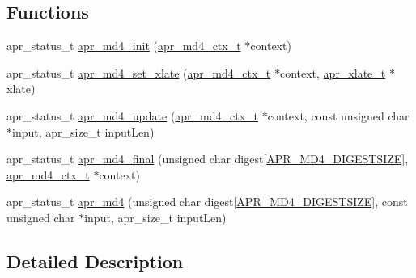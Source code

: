 \subsection*{Functions}
\begin{DoxyCompactItemize}
\item 
apr\-\_\-status\-\_\-t \hyperlink{group___a_p_r___util___m_d4_ga3f2ae0d6d93b1dd7a5efe11c241aee4b}{apr\-\_\-md4\-\_\-init} (\hyperlink{structapr__md4__ctx__t}{apr\-\_\-md4\-\_\-ctx\-\_\-t} $\ast$context)
\item 
apr\-\_\-status\-\_\-t \hyperlink{group___a_p_r___util___m_d4_ga86138845d199bf164093670fb2a803c3}{apr\-\_\-md4\-\_\-set\-\_\-xlate} (\hyperlink{structapr__md4__ctx__t}{apr\-\_\-md4\-\_\-ctx\-\_\-t} $\ast$context, \hyperlink{group___a_p_r___x_l_a_t_e_ga069dabbadc30e3a4157c38104a250e77}{apr\-\_\-xlate\-\_\-t} $\ast$xlate)
\item 
apr\-\_\-status\-\_\-t \hyperlink{group___a_p_r___util___m_d4_gacbdaec9b84aa725c29fcaac196065556}{apr\-\_\-md4\-\_\-update} (\hyperlink{structapr__md4__ctx__t}{apr\-\_\-md4\-\_\-ctx\-\_\-t} $\ast$context, const unsigned char $\ast$input, apr\-\_\-size\-\_\-t input\-Len)
\item 
apr\-\_\-status\-\_\-t \hyperlink{group___a_p_r___util___m_d4_ga292ac23cbfedc3ff227ced262ec09b30}{apr\-\_\-md4\-\_\-final} (unsigned char digest\mbox{[}\hyperlink{group___a_p_r___util___m_d4_ga84489272090a11902d831c288c81c20f}{A\-P\-R\-\_\-\-M\-D4\-\_\-\-D\-I\-G\-E\-S\-T\-S\-I\-Z\-E}\mbox{]}, \hyperlink{structapr__md4__ctx__t}{apr\-\_\-md4\-\_\-ctx\-\_\-t} $\ast$context)
\item 
apr\-\_\-status\-\_\-t \hyperlink{group___a_p_r___util___m_d4_ga8f11756aee7a293e2b05f9b1ed112431}{apr\-\_\-md4} (unsigned char digest\mbox{[}\hyperlink{group___a_p_r___util___m_d4_ga84489272090a11902d831c288c81c20f}{A\-P\-R\-\_\-\-M\-D4\-\_\-\-D\-I\-G\-E\-S\-T\-S\-I\-Z\-E}\mbox{]}, const unsigned char $\ast$input, apr\-\_\-size\-\_\-t input\-Len)
\end{DoxyCompactItemize}


\subsection{Detailed Description}


